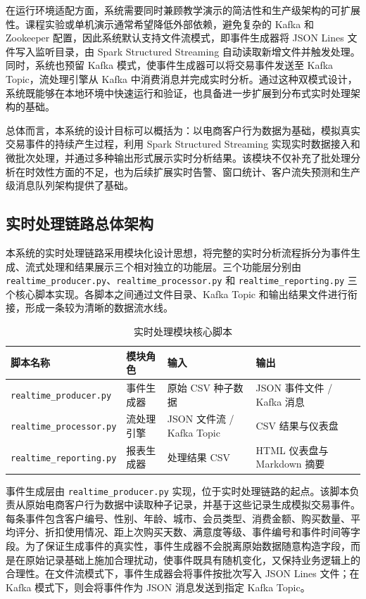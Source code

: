 \documentclass[12pt,hyperref,a4paper,UTF8]{ctexart}
\begin{document}
在运行环境适配方面，系统需要同时兼顾教学演示的简洁性和生产级架构的可扩展性。课程实验或单机演示通常希望降低外部依赖，避免复杂的 Kafka 和 Zookeeper 配置，因此系统默认支持文件流模式，即事件生成器将 JSON Lines 文件写入监听目录，由 Spark Structured Streaming 自动读取新增文件并触发处理。同时，系统也预留 Kafka 模式，使事件生成器可以将交易事件发送至 Kafka Topic，流处理引擎从 Kafka 中消费消息并完成实时分析。通过这种双模式设计，系统既能够在本地环境中快速运行和验证，也具备进一步扩展到分布式实时处理架构的基础。

总体而言，本系统的设计目标可以概括为：以电商客户行为数据为基础，模拟真实交易事件的持续产生过程，利用 Spark Structured Streaming 实现实时数据接入和微批次处理，并通过多种输出形式展示实时分析结果。该模块不仅补充了批处理分析在时效性方面的不足，也为后续扩展实时告警、窗口统计、客户流失预测和生产级消息队列架构提供了基础。

\subsection{实时处理链路总体架构}

本系统的实时处理链路采用模块化设计思想，将完整的实时分析流程拆分为事件生成、流式处理和结果展示三个相对独立的功能层。三个功能层分别由 \texttt{realtime\_producer.py}、\texttt{realtime\_processor.py} 和 \texttt{realtime\_reporting.py} 三个核心脚本实现。各脚本之间通过文件目录、Kafka Topic 和输出结果文件进行衔接，形成一条较为清晰的数据流水线。

\begin{table}[H]
\centering
\caption{实时处理模块核心脚本}
\begin{tabular}{llll}
\toprule
脚本名称 & 模块角色 & 输入 & 输出 \\
\midrule
\texttt{realtime\_producer.py} & 事件生成器 & 原始 CSV 种子数据 & JSON 事件文件 / Kafka 消息 \\
\texttt{realtime\_processor.py} & 流处理引擎 & JSON 文件流 / Kafka Topic & CSV 结果与仪表盘 \\
\texttt{realtime\_reporting.py} & 报表生成器 & 处理结果 CSV & HTML 仪表盘与 Markdown 摘要 \\
\bottomrule
\end{tabular}
\end{table}

事件生成层由 \texttt{realtime\_producer.py} 实现，位于实时处理链路的起点。该脚本负责从原始电商客户行为数据中读取种子记录，并基于这些记录生成模拟交易事件。每条事件包含客户编号、性别、年龄、城市、会员类型、消费金额、购买数量、平均评分、折扣使用情况、距上次购买天数、满意度等级、事件编号和事件时间等字段。为了保证生成事件的真实性，事件生成器不会脱离原始数据随意构造字段，而是在原始记录基础上施加合理扰动，使事件既具有随机变化，又保持业务逻辑上的合理性。在文件流模式下，事件生成器会将事件按批次写入 JSON Lines 文件；在 Kafka 模式下，则会将事件作为 JSON 消息发送到指定 Kafka Topic。
\end{document}
